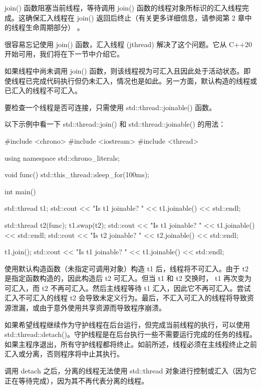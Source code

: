 
join() 函数阻塞当前线程，等待调用 join() 函数的线程对象所标识的汇入线程完成。这确保汇入线程在 join() 返回后终止（有关更多详细信息，请参阅第 2 章中的线程生命周期部分） 。

很容易忘记使用 join() 函数，汇入线程 (jthread) 解决了这个问题。它从 C++20 开始可用，我们将在下一节中介绍它。


如果线程中尚未调用 join() 函数，则该线程视为可汇入且因此处于活动状态。即使线程已完成代码执行但仍未汇入，情况也是如此。另一方面，默认构造的线程或已汇入的线程不可汇入。

要检查一个线程是否可连接，只需使用 std::thread::joinable() 函数。

以下示例中看一下 std::thread::join() 和 std::thread::joinable() 的用法：

\begin{cpp}
#include <chrono>
#include <iostream>
#include <thread>

using namespace std::chrono_literals;

void func() {
    std::this_thread::sleep_for(100ms);
}

int main() {
    std::thread t1;
    std::cout << "Is t1 joinable? " << t1.joinable()
              << std::endl;

    std::thread t2(func);
    t1.swap(t2);
    std::cout << "Is t1 joinable? " << t1.joinable()
              << std::endl;
    std::cout << "Is t2 joinable? " << t2.joinable()
              << std::endl;

    t1.join();
    std::cout << "Is t1 joinable? " << t1.joinable()
              << std::endl;
}
\end{cpp}

使用默认构造函数（未指定可调用对象）构造 t1 后，线程将不可汇入。由于 t2 是指定函数构造的，因此构造后 t2 可汇入。但当 t1 和 t2 交换时， t1 再次变为可汇入，而 t2 不再可汇入。然后主线程等待 t1 汇入，因此它不再可汇入。尝试汇入不可汇入的线程 t2 会导致未定义行为。最后，不汇入可汇入的线程将导致资源泄漏，或由于意外使用共享资源而导致程序崩溃。


如果希望线程继续作为守护线程在后台运行，但完成当前线程的执行，可以使用 std::thread::detach()。守护线程是在后台执行一些不需要运行完成的任务的线程。如果主程序退出，所有守护线程都将终止。如前所述，线程必须在主线程终止之前汇入或分离，否则程序将中止其执行。

调用 detach 之后，分离的线程无法使用 std::thread 对象进行控制或汇入（因为它正在等待完成），因为其不再代表分离的线程。

